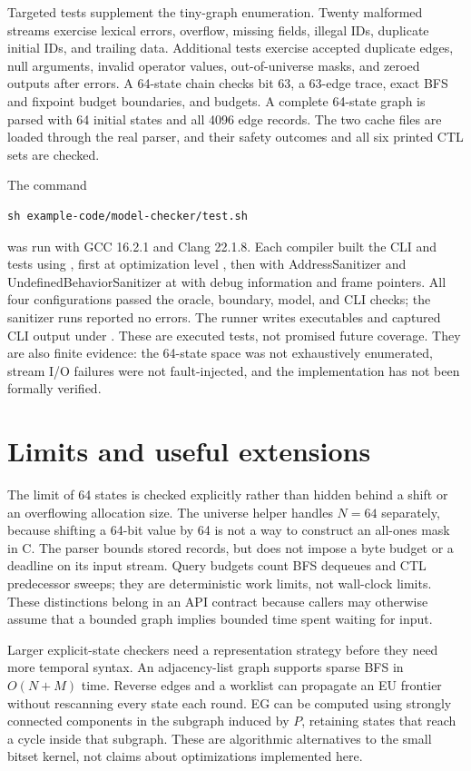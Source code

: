 Targeted tests supplement the tiny-graph enumeration.
Twenty malformed streams exercise lexical errors, overflow, missing fields, illegal IDs, duplicate initial IDs, and trailing data.
Additional tests exercise accepted duplicate edges, null arguments, invalid operator values, out-of-universe masks, and zeroed outputs after errors.
A 64-state chain checks bit 63, a 63-edge trace, exact BFS and fixpoint budget boundaries, and  budgets.
A complete 64-state graph is parsed with 64 initial states and all 4096 edge records.
The two cache files are loaded through the real parser, and their safety outcomes and all six printed CTL sets are checked.

The command
\begin{verbatim}
sh example-code/model-checker/test.sh
\end{verbatim}
was run with GCC 16.2.1 and Clang 22.1.8.
Each compiler built the CLI and tests using , first at optimization level , then with AddressSanitizer and UndefinedBehaviorSanitizer at  with debug information and frame pointers.
All four configurations passed the oracle, boundary, model, and CLI checks; the sanitizer runs reported no errors.
The runner writes executables and captured CLI output under .
These are executed tests, not promised future coverage.
They are also finite evidence: the 64-state space was not exhaustively enumerated, stream I/O failures were not fault-injected, and the implementation has not been formally verified.

\section{Limits and useful extensions}
\label{sec:ch48-limits}

The limit of 64 states is checked explicitly rather than hidden behind a shift or an overflowing allocation size.
The universe helper handles $N=64$ separately, because shifting a 64-bit value by 64 is not a way to construct an all-ones mask in C.
The parser bounds stored records, but does not impose a byte budget or a deadline on its input stream.
Query budgets count BFS dequeues and CTL predecessor sweeps; they are deterministic work limits, not wall-clock limits.
These distinctions belong in an API contract because callers may otherwise assume that a bounded graph implies bounded time spent waiting for input.

Larger explicit-state checkers need a representation strategy before they need more temporal syntax.
An adjacency-list graph supports sparse BFS in $O(N+M)$ time.
Reverse edges and a worklist can propagate an EU frontier without rescanning every state each round.
EG can be computed using strongly connected components in the subgraph induced by $P$, retaining states that reach a cycle inside that subgraph.
These are algorithmic alternatives to the small bitset kernel, not claims about optimizations implemented here.

